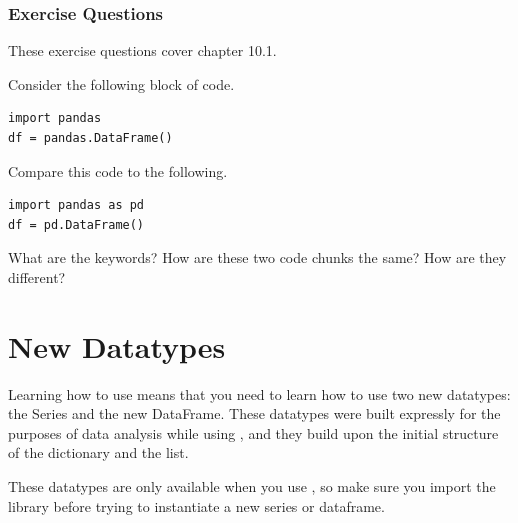 \subsubsection*{Exercise Questions}
These exercise questions cover chapter 10.1.
\begin{Exercise}
Consider the following block of code.
\begin{lstlisting}[style=pippython]
import pandas
df = pandas.DataFrame()
\end{lstlisting}
Compare this code to the following.
\begin{lstlisting}[style=pippython]
import pandas as pd
df = pd.DataFrame()
\end{lstlisting}
What are the keywords? How are these two code chunks the same? How are they different?
\end{Exercise}
\begin{Exercise}
\end{Exercise}
\begin{Exercise}
\end{Exercise}
\section{New Datatypes}
Learning how to use  means that you need to learn how to use two new datatypes: the Series and the new DataFrame. These datatypes were built expressly for the purposes of data analysis while using , and they build upon the initial structure of the dictionary and the list.\par
These datatypes are only available when you use , so make sure you import the  library before trying to instantiate a new series or dataframe.
